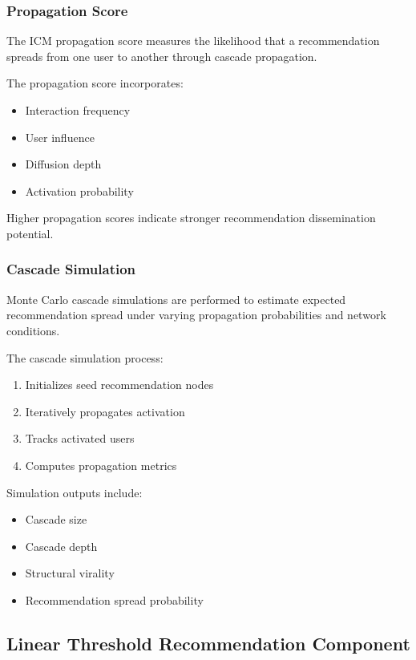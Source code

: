 \documentclass{article}
\begin{document}
\subsubsection{Propagation Score}

The ICM propagation score measures the likelihood that a recommendation spreads from one user to another through cascade propagation.

The propagation score incorporates:
\begin{itemize}
\item Interaction frequency
\item User influence
\item Diffusion depth
\item Activation probability
\end{itemize}

Higher propagation scores indicate stronger recommendation dissemination potential.

\subsubsection{Cascade Simulation}

Monte Carlo cascade simulations are performed to estimate expected recommendation spread under varying propagation probabilities and network conditions.

The cascade simulation process:
\begin{enumerate}
\item Initializes seed recommendation nodes
\item Iteratively propagates activation
\item Tracks activated users
\item Computes propagation metrics
\end{enumerate}

Simulation outputs include:
\begin{itemize}
\item Cascade size
\item Cascade depth
\item Structural virality
\item Recommendation spread probability
\end{itemize}

\subsection{Linear Threshold Recommendation Component}
\end{document}
